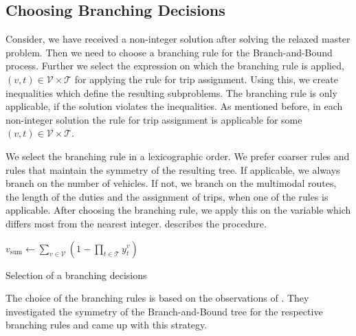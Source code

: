 
\subsection{Choosing Branching Decisions}

Consider, we have received a non-integer solution after solving the relaxed master problem. Then we need to choose a branching rule for the Branch-and-Bound process. Further we select the expression on which the branching rule is applied, \eg ${(v,t)\in\mathcal{V}\times\mathcal{T}}$ for applying the rule for trip assignment. Using this, we create inequalities which define the resulting subproblems. The branching rule is only applicable, if the solution violates the inequalities. As mentioned before, in each non-integer solution the rule for trip assignment is applicable for some ${(v,t) \in\mathcal{V}\times\mathcal{T}}$.

We select the branching rule in a lexicographic order. We prefer coarser rules and rules that maintain the symmetry of the resulting tree. If applicable, we always branch on the number of vehicles. If not, we branch on the multimodal routes, the length of the duties and the assignment of trips, when one of the rules is applicable. After choosing the branching rule, we apply this on the variable which differs most from the nearest integer.  describes the procedure.

\begin{algorithm}[hbt]
	\SetAlgoLined
	$v_{\operatorname{sum}}\gets\sum_{v\in\mathcal{V}}\left(1-\prod_{t\in\mathcal{T}}y^v_t\right)$\;
	\caption{Selection of a branching decisions}
	\label{alg:branching_decision}
\end{algorithm}

The choice of the branching rules is based on the observations of \cite[Sec.~8.3]{Kaiser}. They investigated the symmetry of the Branch-and-Bound tree for the respective branching rules and came up with this strategy.